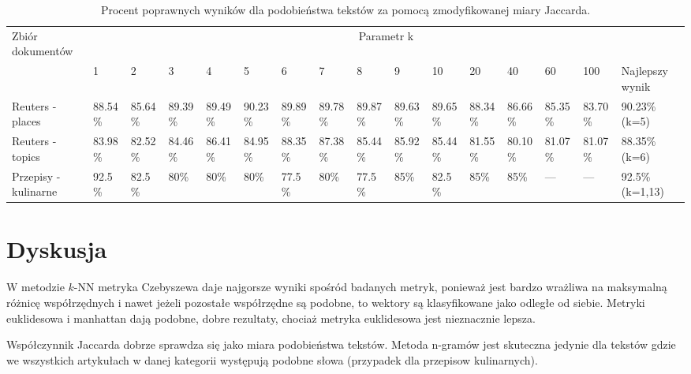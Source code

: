 \documentclass{classrep}
\begin{document}
\begingroup
{\scriptsize  
\setlength{\LTleft}{-20cm plus -1fill}
\setlength{\LTright}{\LTleft}

\begin{longtable}{|p{1cm}|p{0.7cm}|p{0.7cm}|p{0.7cm}|p{0.7cm}|p{0.7cm}|p{0.7cm}|p{0.7cm}|p{0.7cm}|p{0.7cm}|p{0.7cm}|p{0.7cm}|p{0.7cm}|p{0.7cm}|p{0.7cm}|p{1.1cm}|}
\caption{ Procent poprawnych wyników dla podobieństwa tekstów za pomocą zmodyfikowanej miary Jaccarda.}\\ 
\hline

Zbiór
dokumentów

 &\multicolumn{15}{c|}{Parametr k}\\
\cline{2-16}
& 1
& 2
& 3
& 4
& 5
& 6
& 7
& 8
& 9
& 10
& 20
& 40
& 60
& 100
& Najlepszy wynik
\\ \hline\hline
Reuters
- places
& 88.54\%	%
& 85.64\%	%
& 89.39\%	%
& 89.49\%	%
& 90.23\%	%
& 89.89\%	%
& 89.78\%	%
& 89.87\%	%
& 89.63\%	%
& 89.65\%	%
& 88.34\%	%
& 86.66\%	%
& 85.35\%	%
& 83.70\%	%

& 90.23\%	(k=5)
\\ \hline
Reuters
- topics
& 83.98\%	%
& 82.52\%	%
& 84.46\%	%
& 86.41\%	%
& 84.95\%	%
& 88.35\%	%
& 87.38\%	%
& 85.44\%	%
& 85.92\%	%
& 85.44\%	%
& 81.55\%	%
& 80.10\%	%
& 81.07\%	%
& 81.07\%	%

& 88.35\%	(k=6)
\\ \hline
Przepisy
- kulinarne 
& 92.5\%	%
& 82.5\%	%
& 80\%		%
& 80\%		%
& 80\%		%
& 77.5\%	%
& 80\%		%
& 77.5\%	%
& 85\%		%
& 82.5\%	%
& 85\%		%
& 85\%		%
& ---		%
& ---		%
& 92.5\% (k=1,13)
\\ \hline
\end{longtable}
}
\endgroup



\section{Dyskusja}
W metodzie $k$-NN metryka Czebyszewa daje najgorsze wyniki spośród badanych metryk, ponieważ jest bardzo wrażliwa na maksymalną różnicę współrzędnych i nawet jeżeli pozostałe współrzędne są podobne, to wektory są klasyfikowane jako odległe od siebie. Metryki euklidesowa i manhattan dają podobne, dobre rezultaty, chociaż metryka euklidesowa jest nieznacznie lepsza.

Współczynnik Jaccarda dobrze sprawdza się jako miara podobieństwa tekstów. Metoda n-gramów jest skuteczna jedynie dla tekstów gdzie we wszystkich artykułach w danej kategorii występują podobne słowa (przypadek dla przepisow kulinarnych).
\end{document}
